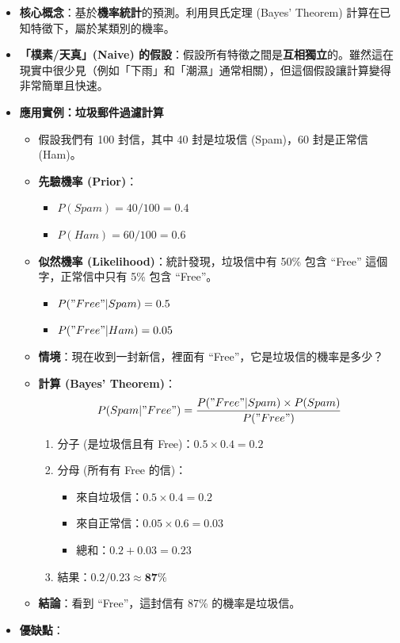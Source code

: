 \documentclass[
  letterpaper,
  DIV=11,
  numbers=noendperiod]{scrreprt}
\providecommand{\tightlist}{%
  \setlength{\itemsep}{0pt}\setlength{\parskip}{0pt}}
\begin{document}
\begin{itemize}
\tightlist
\item
  \textbf{核心概念}：基於\textbf{機率統計}的預測。利用貝氏定理 (Bayes'
  Theorem) 計算在已知特徵下，屬於某類別的機率。
\item
  \textbf{「樸素/天真」(Naive)
  的假設}：假設所有特徵之間是\textbf{互相獨立}的。雖然這在現實中很少見（例如「下雨」和「潮濕」通常相關），但這個假設讓計算變得非常簡單且快速。
\item
  \textbf{應用實例：垃圾郵件過濾計算}

  \begin{itemize}
  \tightlist
  \item
    假設我們有 100 封信，其中 40 封是垃圾信 (Spam)，60 封是正常信
    (Ham)。
  \item
    \textbf{先驗機率 (Prior)}：

    \begin{itemize}
    \tightlist
    \item
      \(P(Spam) = 40/100 = 0.4\)
    \item
      \(P(Ham) = 60/100 = 0.6\)
    \end{itemize}
  \item
    \textbf{似然機率 (Likelihood)}：統計發現，垃圾信中有 50\% 包含
    ``Free'' 這個字，正常信中只有 5\% 包含 ``Free''。

    \begin{itemize}
    \tightlist
    \item
      \(P("Free" | Spam) = 0.5\)
    \item
      \(P("Free" | Ham) = 0.05\)
    \end{itemize}
  \item
    \textbf{情境}：現在收到一封新信，裡面有
    ``Free''，它是垃圾信的機率是多少？
  \item
    \textbf{計算 (Bayes' Theorem)}：
    \[ P(Spam | "Free") = \frac{P("Free" | Spam) \times P(Spam)}{P("Free")} \]

    \begin{enumerate}
    \def\labelenumi{\arabic{enumi}.}
    \tightlist
    \item
      分子 (是垃圾信且有 Free)：\(0.5 \times 0.4 = 0.2\)
    \item
      分母 (所有有 Free 的信)：

      \begin{itemize}
      \tightlist
      \item
        來自垃圾信：\(0.5 \times 0.4 = 0.2\)
      \item
        來自正常信：\(0.05 \times 0.6 = 0.03\)
      \item
        總和：\(0.2 + 0.03 = 0.23\)
      \end{itemize}
    \item
      結果：\(0.2 / 0.23 \approx \mathbf{87\%}\)
    \end{enumerate}
  \item
    \textbf{結論}：看到 ``Free''，這封信有 87\% 的機率是垃圾信。
  \end{itemize}
\item
  \textbf{優缺點}：


\end{itemize}
\end{document}
